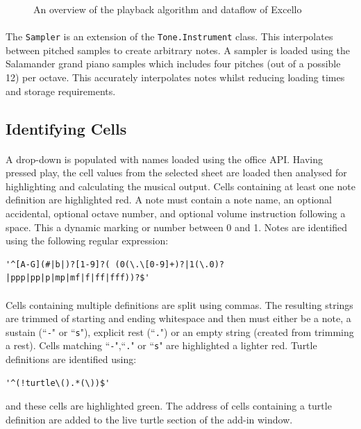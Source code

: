 \begin{figure}[htb]
\begin{center}

\end{center}
\caption{An overview of the playback algorithm and dataflow of Excello}
\label{fig:overview}
\end{figure}

\paragraph{} The \texttt{Sampler} is an extension of the \texttt{Tone.Instrument} class. This interpolates between pitched samples to create arbitrary notes. A sampler is loaded using the Salamander grand piano samples which includes four pitches (out of a possible 12) per octave. This accurately interpolates notes whilst reducing loading times and storage requirements.

\subsection{Identifying Cells}

\paragraph{} A drop-down is populated with names loaded using the office API. Having pressed play, the cell values from the selected sheet are loaded then analysed for highlighting and calculating the musical output. Cells containing at least one note definition are highlighted red. A note must contain a note name, an optional accidental, optional octave number, and optional volume instruction following a space. This a dynamic marking or number between 0 and 1. Notes are identified using the following regular expression:

\begin{verbatim}
'^[A-G](#|b|)?[1-9]?( (0(\.\[0-9]+)?|1(\.0)?|ppp|pp|p|mp|mf|f|ff|fff))?$'
\end{verbatim}

\paragraph{} Cells containing multiple definitions are split using commas. The resulting strings are trimmed of starting and ending whitespace and then must either be a note, a sustain (``\texttt{-}" or ``\texttt{s}"), explicit rest (``\texttt{.}") or an empty string (created from trimming a rest). Cells matching ``\texttt{-}",``\texttt{.}" or ``\texttt{s}" are highlighted a lighter red. Turtle definitions are identified using:
\begin{verbatim}
'^(!turtle\().*(\))$'
\end{verbatim}
and these cells are highlighted green. The address of cells containing a turtle definition are added to the live turtle section of the add-in window.

